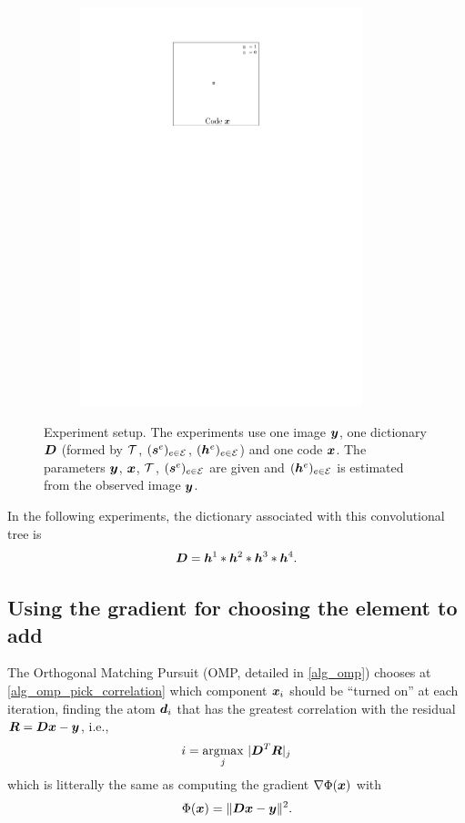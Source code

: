 \begin{figure}[!ht]
\begin{subfigure}[b]{0.32\textwidth}
	\includegraphics[width=0.9\textwidth]{figures/xp_explain/code.pdf}
	\caption{}
\end{subfigure}
\caption{Experiment setup. The experiments use one image $\bm{y}$, one dictionary $\bm{D}$ (formed by $\mathcal T$, $(\bm{s}^e)_{e \in \mathcal E}$, $(\bm{h}^e)_{e \in \mathcal E}$) and one code $\bm{x}$. The parameters $\bm{y}$, $\bm{x}$, $\mathcal T$, $(\bm{s}^e)_{e \in \mathcal E}$ are given and $(\bm{h}^e)_{e \in \mathcal E}$ is estimated from the observed image $\bm{y}$.}\label{fig_xp_explain}
\end{figure}
In the following experiments, the dictionary associated with this convolutional tree is 
\begin{equation*}\bm{D} = \bm{h}^1 * \bm{h}^2 * \bm{h}^3 * \bm{h}^4.\end{equation*}

\subsection{Using the gradient for choosing the element to add}

The Orthogonal Matching Pursuit (\ac{OMP}, detailed in \cref{alg_omp}) chooses at \cref{alg_omp_pick_correlation} which component $\bm{x}_i$ should be “turned on” at each iteration, finding the atom $\bm{d}_i$ that has the greatest correlation with the residual $\bm{R} = \bm{D}\bm{x} - \bm{y}$, i.e.,
\begin{equation*} i = \underset{j}{\operatorname*{\arg\!\max}} ~ | \bm{D}^T \bm{R} |_j \end{equation*}
which is litterally the same as computing the gradient $\nabla \Phi(\bm{x})$ with \begin{equation*}\Phi(\bm{x}) = \lVert \bm{D}\bm{x} - \bm{y} \rVert^2.\end{equation*}

